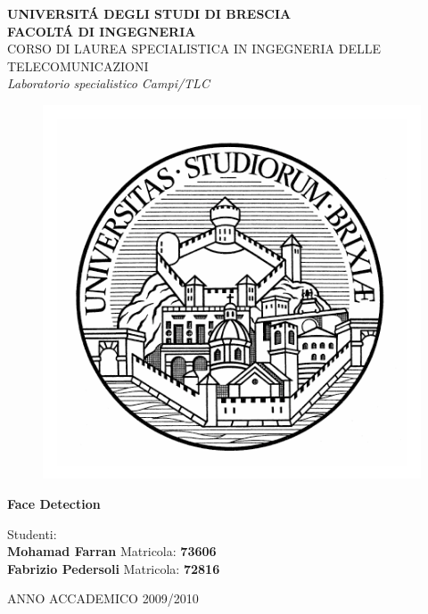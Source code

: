 
\begin{titlepage} 
 
\begin{center}
  
  {\bfseries \scshape \Large UNIVERSIT\'A DEGLI STUDI DI BRESCIA
    \\[0.2cm] 
    FACOLT\'A DI INGEGNERIA}\\ [0.35cm]

  {CORSO DI LAUREA SPECIALISTICA IN INGEGNERIA DELLE TELECOMUNICAZIONI}\\ [0.7cm]
  
  {\Large \emph{Laboratorio specialistico Campi/TLC}}\\[10mm]

  \begin{figure}[!h]
    \centering
    \includegraphics[scale=0.7]{logo}
  \end{figure}
     
  \vspace{1cm}

  {\huge\bfseries Face Detection}\\[0.2cm]

  \vspace{2cm}
  
  \begin{flushleft} \large
    Studenti: \\
    \textbf{Mohamad Farran} \hfill Matricola: \textbf{73606}\\
    \textbf{Fabrizio Pedersoli} \hfill Matricola: \textbf{72816}
\end{flushleft}
 
\vfill

{\large ANNO ACCADEMICO 2009/2010}
    
\end{center}

\end{titlepage}


